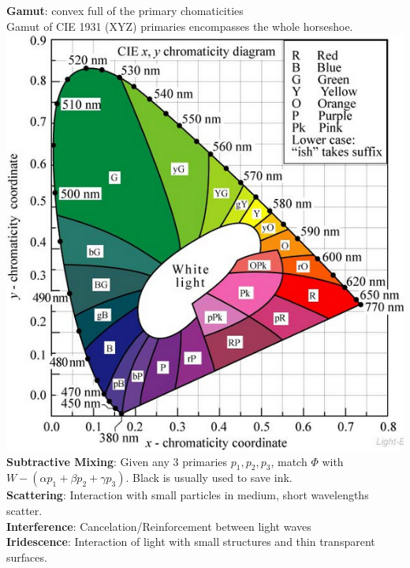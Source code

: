\documentclass[3pt,landscape]{article}
\begin{document}
\begin{multicols}{3}
{\bf Gamut}: convex full of the primary chomaticities\\
Gamut of CIE 1931 (XYZ) primaries encompasses the whole horseshoe.\\
\includegraphics[scale=0.4]{images/gamut}\\
{\bf Subtractive Mixing}: Given any 3 primaries \(p_1,p_2,p_3\), match \(\Phi\) with \(W-(\alpha p_1 + \beta p_2 + \gamma p_3)\). Black is usually used to save ink.\\
{\bf Scattering}: Interaction with small particles in medium, short wavelengths scatter.\\
{\bf Interference}: Cancelation/Reinforcement between light waves\\
{\bf Iridescence}: Interaction of light with small structures and thin transparent surfaces.\\


\end{multicols}
\end{document}
